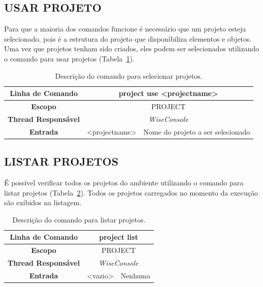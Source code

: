 \subsection{USAR PROJETO}\label{sec:use_projects}

Para que a maioria dos comandos funcione é necessário que um projeto esteja selecionado, pois é a estrutura do projeto que disponibiliza elementos e objetos. Uma vez que projetos tenham sido criados, eles podem ser selecionados utilizando o comando para usar projetos (Tabela~\ref{tab:use_project}).

\begin{center}
	\begin{table}[!htbp]
		\begin{tabularx}{\textwidth}{c|c|X}
			\toprule
			\textbf{Linha de Comando} & \multicolumn{2}{c}{project use <project\underline{\space\space}name>} \\
			\midrule
			\textbf{Escopo} & \multicolumn{2}{c}{PROJECT} \\
			\hline
			\textbf{Thread Responsável} & \multicolumn{2}{c}{\textit{WiseConsole}} \\
			\hline
			\textbf{Entrada} & <project\underline{\space\space}name> & Nome do projeto a ser selecionado \\
			\bottomrule
		\end{tabularx}
		\caption{Descrição do comando para selecionar projetos.}
		\label{tab:use_project}
	\end{table}
\end{center}

\subsection{LISTAR PROJETOS}\label{sec:list_projects}

É possível verificar todos os projetos do ambiente utilizando o comando para listar projetos (Tabela~\ref{tab:list_project}). Todos os projetos carregados no momento da execução são exibidos na listagem.

\begin{center}
	\begin{table}[!htbp]
		\begin{tabularx}{\textwidth}{c|c|X}
			\toprule
			\textbf{Linha de Comando} & \multicolumn{2}{c}{project list} \\
			\midrule
			\textbf{Escopo} & \multicolumn{2}{c}{PROJECT} \\
			\hline
			\textbf{Thread Responsável} & \multicolumn{2}{c}{\textit{WiseConsole}} \\
			\hline
			\textbf{Entrada} & <vazio> & Nenhuma \\
			\bottomrule
		\end{tabularx}
		\caption{Descrição do comando para listar projetos.}
		\label{tab:list_project}
	\end{table}
\end{center}

